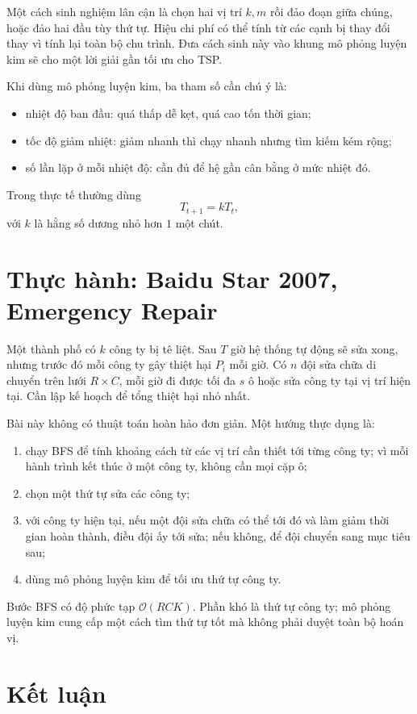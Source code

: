 \documentclass[11pt]{article}
\newcommand{\Oh}{\mathcal{O}}
\begin{document}
Một cách sinh nghiệm lân cận là chọn hai vị trí \(k,m\) rồi đảo đoạn giữa
chúng, hoặc đảo hai đầu tùy thứ tự. Hiệu chi phí có thể tính từ các cạnh bị
thay đổi thay vì tính lại toàn bộ chu trình. Đưa cách sinh này vào khung mô
phỏng luyện kim sẽ cho một lời giải gần tối ưu cho TSP.

Khi dùng mô phỏng luyện kim, ba tham số cần chú ý là:
\begin{itemize}
  \item nhiệt độ ban đầu: quá thấp dễ kẹt, quá cao tốn thời gian;
  \item tốc độ giảm nhiệt: giảm nhanh thì chạy nhanh nhưng tìm kiếm kém rộng;
  \item số lần lặp ở mỗi nhiệt độ: cần đủ để hệ gần cân bằng ở mức nhiệt đó.
\end{itemize}
Trong thực tế thường dùng
\[
  T_{t+1}=kT_t,
\]
với \(k\) là hằng số dương nhỏ hơn \(1\) một chút.

\section{Thực hành: Baidu Star 2007, Emergency Repair}

Một thành phố có \(k\) công ty bị tê liệt. Sau \(T\) giờ hệ thống tự động sẽ
sửa xong, nhưng trước đó mỗi công ty gây thiệt hại \(P_i\) mỗi giờ. Có \(n\)
đội sửa chữa di chuyển trên lưới \(R\times C\), mỗi giờ đi được tối đa \(s\)
ô hoặc sửa công ty tại vị trí hiện tại. Cần lập kế hoạch để tổng thiệt hại nhỏ
nhất.

Bài này không có thuật toán hoàn hảo đơn giản. Một hướng thực dụng là:
\begin{enumerate}
  \item chạy BFS để tính khoảng cách từ các vị trí cần thiết tới từng công ty;
  vì mỗi hành trình kết thúc ở một công ty, không cần mọi cặp ô;
  \item chọn một thứ tự sửa các công ty;
  \item với công ty hiện tại, nếu một đội sửa chữa có thể tới đó và làm giảm
  thời gian hoàn thành, điều đội ấy tới sửa; nếu không, để đội chuyển sang mục
  tiêu sau;
  \item dùng mô phỏng luyện kim để tối ưu thứ tự công ty.
\end{enumerate}

Bước BFS có độ phức tạp \(\Oh(RCK)\). Phần khó là thứ tự công ty; mô phỏng
luyện kim cung cấp một cách tìm thứ tự tốt mà không phải duyệt toàn bộ hoán
vị.

\section{Kết luận}
\end{document}
